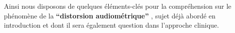 Ainsi nous disposons de quelques éléments-clés pour la compréhension
sur le phénomène de la \textbf{``distorsion audiométrique''} \autocite
{auriol:cle}, sujet déjà abordé en introduction et dont il sera également question dans l'approche
clinique.



